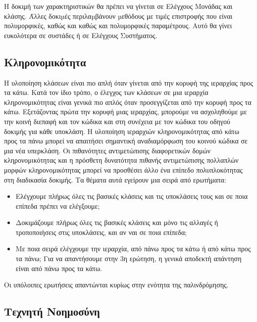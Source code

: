 \documentclass[12pt]{article}
\begin{document}
\par Η δοκιμή των χαρακτηριστικών θα πρέπει να γίνεται σε Ελέγχους Μονάδας και κλάσης. Άλλες δοκιµές περιλαµβάνουν µεθόδους  με τιμές επιστροφής που είναι πολυμορφικές, καθώς και καθώς και πολυμορφικές παραμέτρους. Αυτό θα γίνει ευκολότερα σε συστάδες ή σε Ελέγχους Συστήματος.


\subsection{Κληρονομικότητα}

Η υλοποίηση κλάσεων είναι πιο απλή όταν γίνεται από την κορυφή της ιεραρχίας προς τα κάτω. Κατά τον ίδιο τρόπο, ο έλεγχος των κλάσεων σε μια ιεραρχία κληρονομικότητας είναι γενικά πιο απλός όταν προσεγγίζεται από την κορυφή προς τα κάτω. Εξετάζοντας πρώτα την κορυφή μιας ιεραρχίας, μπορούμε να ασχοληθούμε με την κοινή διεπαφή και τον κώδικα και στη συνέχεια με τον κώδικα του οδηγού δοκιμής για κάθε υποκλάση. Η υλοποίηση ιεραρχιών κληρονομικότητας από κάτω προς τα πάνω μπορεί να απαιτήσει σημαντική αναδιαμόρφωση του κοινού κώδικα σε μια νέα υπερκλάση. Οι πιθανότητες αντιμετώπισης διαφορετικών δομών κληρονομικότητας και η πρόσθετη δυνατότητα πιθανής αντιμετώπισης πολλαπλών μορφών κληρονομικότητας μπορεί να προσθέσει άλλο ένα επίπεδο πολυπλοκότητας στη διαδικασία δοκιμής. Τα θέματα αυτά εγείρουν μια σειρά από ερωτήματα:

\begin{itemize}
\item Ελέγχουμε πλήρως όλες τις βασικές κλάσεις και τις υποκλάσεις τους και σε ποια επίπεδα πρέπει να ελέγξουμε; 
\item Δοκιμάζουμε πλήρως όλες τις βασικές κλάσεις και μόνο τις αλλαγές ή τροποποιήσεις στις υποκλάσεις, και αν ναι σε ποια επίπεδα;
\item Με ποια σειρά ελέγχουμε την ιεραρχία, από πάνω προς τα κάτω ή από κάτω προς τα πάνω;
Για να απαντήσουμε στην 3η ερώτηση, η γενικά αποδεκτή απάντηση είναι από πάνω προς τα κάτω.
\end{itemize}

\par Οι υπόλοιπες ερωτήσεις απαντώνται κυρίως στην ενότητα της παλινδρόμησης.

\subsection{Τεχνητή Νοημοσύνη}

\end{document}
